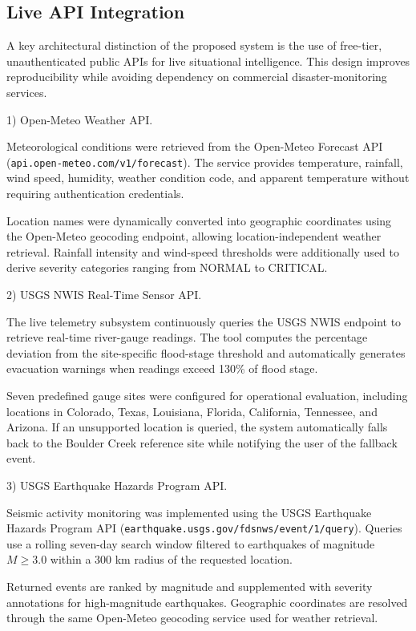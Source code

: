 \documentclass[conference]{IEEEtran}
\begin{document}
\subsection{Live API Integration}

A key architectural distinction of the proposed system is the use of free-tier,
unauthenticated public APIs for live situational intelligence. This design improves
reproducibility while avoiding dependency on commercial disaster-monitoring services.

1) Open-Meteo Weather API.

Meteorological conditions were retrieved from the Open-Meteo Forecast API
(\texttt{api.open-meteo.com/v1/forecast}). The service provides temperature,
rainfall, wind speed, humidity, weather condition code, and apparent temperature
without requiring authentication credentials.

Location names were dynamically converted into geographic coordinates using the
Open-Meteo geocoding endpoint, allowing location-independent weather retrieval.
Rainfall intensity and wind-speed thresholds were additionally used to derive
severity categories ranging from NORMAL to CRITICAL.

2) USGS NWIS Real-Time Sensor API.

The live telemetry subsystem continuously queries the USGS NWIS endpoint to retrieve
real-time river-gauge readings. The tool computes the percentage deviation from the
site-specific flood-stage threshold and automatically generates evacuation warnings
when readings exceed 130\% of flood stage.

Seven predefined gauge sites were configured for operational evaluation, including
locations in Colorado, Texas, Louisiana, Florida, California, Tennessee, and Arizona.
If an unsupported location is queried, the system automatically falls back to the
Boulder Creek reference site while notifying the user of the fallback event.

3) USGS Earthquake Hazards Program API.

Seismic activity monitoring was implemented using the USGS Earthquake Hazards Program
API (\texttt{earthquake.usgs.gov/fdsnws/event/1/query}). Queries use a rolling
seven-day search window filtered to earthquakes of magnitude \(M \geq 3.0\) within
a 300 km radius of the requested location.

Returned events are ranked by magnitude and supplemented with severity annotations
for high-magnitude earthquakes. Geographic coordinates are resolved through the same
Open-Meteo geocoding service used for weather retrieval.
\end{document}

